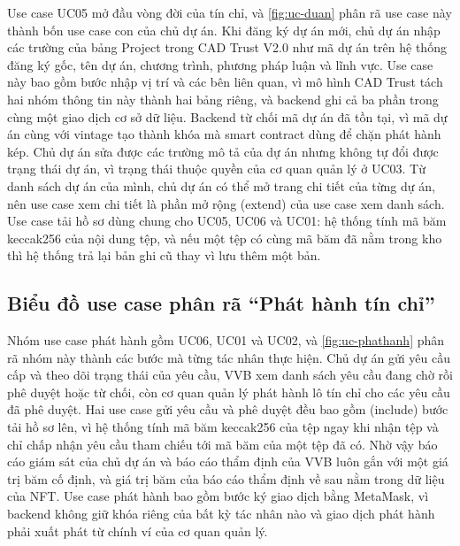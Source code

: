 Use case UC05 mở đầu vòng đời của tín chỉ, và \autoref{fig:uc-duan} phân rã use case này thành bốn use case con của chủ dự án. Khi đăng ký dự án mới, chủ dự án nhập các trường của bảng Project trong CAD Trust V2.0 như mã dự án trên hệ thống đăng ký gốc, tên dự án, chương trình, phương pháp luận và lĩnh vực. Use case này bao gồm bước nhập vị trí và các bên liên quan, vì mô hình CAD Trust tách hai nhóm thông tin này thành hai bảng riêng, và backend ghi cả ba phần trong cùng một giao dịch cơ sở dữ liệu. Backend từ chối mã dự án đã tồn tại, vì mã dự án cùng với vintage tạo thành khóa mà smart contract dùng để chặn phát hành kép. Chủ dự án sửa được các trường mô tả của dự án nhưng không tự đổi được trạng thái dự án, vì trạng thái thuộc quyền của cơ quan quản lý ở UC03. Từ danh sách dự án của mình, chủ dự án có thể mở trang chi tiết của từng dự án, nên use case xem chi tiết là phần mở rộng (extend) của use case xem danh sách. Use case tải hồ sơ dùng chung cho UC05, UC06 và UC01: hệ thống tính mã băm keccak256 của nội dung tệp, và nếu một tệp có cùng mã băm đã nằm trong kho thì hệ thống trả lại bản ghi cũ thay vì lưu thêm một bản.

\HinhUCDuAn

\subsection*{Biểu đồ use case phân rã ``Phát hành tín chỉ''}
\label{subsec:uc-phathanh}

Nhóm use case phát hành gồm UC06, UC01 và UC02, và \autoref{fig:uc-phathanh} phân rã nhóm này thành các bước mà từng tác nhân thực hiện. Chủ dự án gửi yêu cầu cấp và theo dõi trạng thái của yêu cầu, VVB xem danh sách yêu cầu đang chờ rồi phê duyệt hoặc từ chối, còn cơ quan quản lý phát hành lô tín chỉ cho các yêu cầu đã phê duyệt. Hai use case gửi yêu cầu và phê duyệt đều bao gồm (include) bước tải hồ sơ lên, vì hệ thống tính mã băm keccak256 của tệp ngay khi nhận tệp và chỉ chấp nhận yêu cầu tham chiếu tới mã băm của một tệp đã có. Nhờ vậy báo cáo giám sát của chủ dự án và báo cáo thẩm định của VVB luôn gắn với một giá trị băm cố định, và giá trị băm của báo cáo thẩm định về sau nằm trong dữ liệu của NFT. Use case phát hành bao gồm bước ký giao dịch bằng MetaMask, vì backend không giữ khóa riêng của bất kỳ tác nhân nào và giao dịch phát hành phải xuất phát từ chính ví của cơ quan quản lý.

